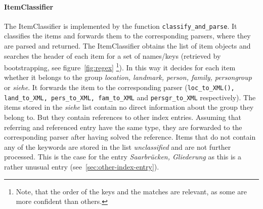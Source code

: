 \paragraph{ItemClassifier}
The ItemClassifier is implemented by the function \texttt{classify\_and\_parse}. It classifies the items and forwards them to the corresponding parsers, where they are parsed and returned. The ItemClassifier obtains the list of item objects and searches the header of each item for a set of names/keys (retrieved by bootstrapping, see figure~\ref{fig:regex} \footnote{Note, that the order of the keys and the matches are relevant, as some are more confident than others.}). In this way it decides for each item whether it belongs to the group \textit{location, landmark, person, family, persongroup} or \textit{siehe}. It forwards the item to the corresponding parser (\texttt{loc\_to\_XML(), land\_to\_XML, pers\_to\_XML, fam\_to\_XML} and \texttt{persgr\_to\_XML} respectively). The items stored in the \textit{siehe} list contain no direct information about the group they belong to. But they contain references to other index entries. Assuming that referring and referenced entry have the same type, they are forwarded to the corresponding parser after having solved the reference. Items that do not contain any of the keywords are stored in the list \textit{unclassified} and are not further processed. This is the case for the entry \textit{Saarbrücken, Gliederung} as this is a rather unusual entry (see~\ref{sec:other-index-entry}).

